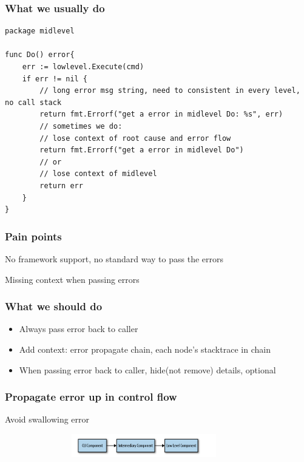 \documentclass[9pt]{beamer}
\begin{document}
\begin{frame}[fragile]
\frametitle{What we usually do}


\begin{verbatim}
package midlevel

func Do() error{
	err := lowlevel.Execute(cmd)
	if err != nil {
		// long error msg string, need to consistent in every level, no call stack
	    return fmt.Errorf("get a error in midlevel Do: %s", err)
	    // sometimes we do: 
	    // lose context of root cause and error flow
	    return fmt.Errorf("get a error in midlevel Do")
	    // or
	    // lose context of midlevel
	    return err
	}
}

\end{verbatim}


\end{frame}

\begin{frame}[fragile]
\frametitle{Pain points}


No framework support, no standard way to pass the errors 


Missing context when passing errors



\end{frame}

\begin{frame}[fragile]
\frametitle{What we should do}


\begin{itemize}
\item Always pass error back to caller
\item Add context: error propagate chain, each node's stacktrace in chain
\item When passing error back to caller, hide(not remove) details, optional
\end{itemize}


\end{frame}

\begin{frame}[fragile]
\frametitle{Propagate error up in control flow}


Avoid swallowing error


\begin{figure}[h]
\begin{center}
\includegraphics[width=10cm,height=1cm]{images/chain.png}
\end{center}

\end{figure}


\end{frame}
\end{document}
